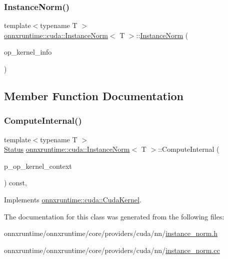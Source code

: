 \subsubsection{\texorpdfstring{Instance\+Norm()}{InstanceNorm()}}
{\footnotesize\ttfamily template$<$typename T $>$ \\
\mbox{\hyperlink{classonnxruntime_1_1cuda_1_1InstanceNorm}{onnxruntime\+::cuda\+::\+Instance\+Norm}}$<$ T $>$\+::\mbox{\hyperlink{classonnxruntime_1_1cuda_1_1InstanceNorm}{Instance\+Norm}} (\begin{DoxyParamCaption}\item[{const \mbox{\hyperlink{classonnxruntime_1_1OpKernelInfo}{Op\+Kernel\+Info}} \&}]{op\+\_\+kernel\+\_\+info }\end{DoxyParamCaption})}



\subsection{Member Function Documentation}
\mbox{\label{classonnxruntime_1_1cuda_1_1InstanceNorm_aa3ec73604290fef52d70f27ba0db097a}} 
\subsubsection{\texorpdfstring{Compute\+Internal()}{ComputeInternal()}}
{\footnotesize\ttfamily template$<$typename T $>$ \\
\mbox{\hyperlink{classonnxruntime_1_1common_1_1Status}{Status}} \mbox{\hyperlink{classonnxruntime_1_1cuda_1_1InstanceNorm}{onnxruntime\+::cuda\+::\+Instance\+Norm}}$<$ T $>$\+::Compute\+Internal (\begin{DoxyParamCaption}\item[{\mbox{\hyperlink{classonnxruntime_1_1OpKernelContext}{Op\+Kernel\+Context}} $\ast$}]{p\+\_\+op\+\_\+kernel\+\_\+context }\end{DoxyParamCaption}) const\hspace{0.3cm}{\ttfamily [override]}, {\ttfamily [virtual]}}



Implements \mbox{\hyperlink{classonnxruntime_1_1cuda_1_1CudaKernel_aca7af04ae448017d6023d30bba231ebb}{onnxruntime\+::cuda\+::\+Cuda\+Kernel}}.



The documentation for this class was generated from the following files\+:\begin{DoxyCompactItemize}
\item 
onnxruntime/onnxruntime/core/providers/cuda/nn/\mbox{\hyperlink{cuda_2nn_2instance__norm_8h}{instance\+\_\+norm.\+h}}\item 
onnxruntime/onnxruntime/core/providers/cuda/nn/\mbox{\hyperlink{cuda_2nn_2instance__norm_8cc}{instance\+\_\+norm.\+cc}}\end{DoxyCompactItemize}
